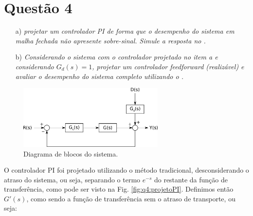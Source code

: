 
  \chapter*{Questão 4}

\begin{itemize}
    \item[a)] {\it projetar um controlador PI de forma que o desempenho do
              sistema em malha fechada não apresente sobre-sinal. Simule a 
              resposta no \Matlab.}
    \item[b)] {\it Considerando o sistema com o controlador projetado no item a
              e considerando $G_d(s) = 1$, projetar um controlador feedforward 
              (realizável) e avaliar o desempenho do sistema completo utilizando
              o \Matlab.}
\end{itemize}

\begin{figure}[H]
\centering
    \includegraphics[width=0.65\textwidth]{imgs/questao4/sistema}
    \caption{Diagrama de blocos do sistema.}
    \label{fig:q4:sist}
\end{figure}

\vspace{0.5cm}


\vspace{0.25cm}

O controlador PI foi projetado utilizando o método tradicional, desconsiderando
o atraso do sistema, ou seja, separando o termo $e^{-s}$ do restante da função
de transferência, como pode ser visto na Fig. \ref{fig:q4:projetoPI}.
Definimos então $G'(s)$, como sendo a função de transferência sem o atraso de
transporte, ou seja:

